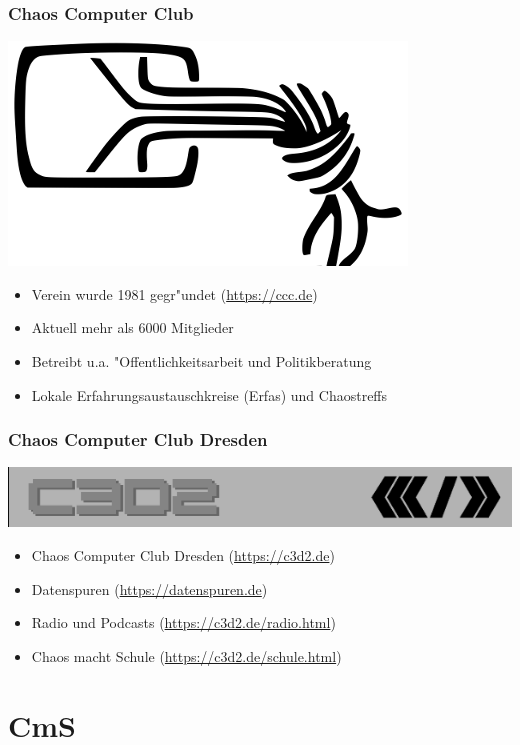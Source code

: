 \documentclass[12pt]{beamer}
\begin{document}
\begin{frame}
	\frametitle{Chaos Computer Club}
	\begin{center}
		\includegraphics[height=0.2\textheight]{img/chaosknoten.png}
	\end{center}	
	\begin{itemize}
		\item<1-> Verein wurde 1981 gegr"undet (\url{https://ccc.de})          
		\item<2-> Aktuell mehr als 6000 Mitglieder
		\item<3-> Betreibt u.a. "Offentlichkeitsarbeit und Politikberatung      
		\item<4-> Lokale Erfahrungsaustauschkreise (Erfas) und Chaostreffs
	\end{itemize}
\end{frame}

\begin{frame}
	\frametitle{Chaos Computer Club Dresden}
	\begin{center}
		\includegraphics[height=0.1\textheight]{img/c3d2_logo.png}
	\end{center}
	\begin{itemize}
		\item<1-> Chaos Computer Club Dresden (\url{https://c3d2.de})          
		\item<2-> Datenspuren (\url{https://datenspuren.de})
		\item<3-> Radio und Podcasts (\url{https://c3d2.de/radio.html})
		\item<4-> Chaos macht Schule (\url{https://c3d2.de/schule.html})
	\end{itemize}
\end{frame}
  
\section{CmS}
\end{document}
